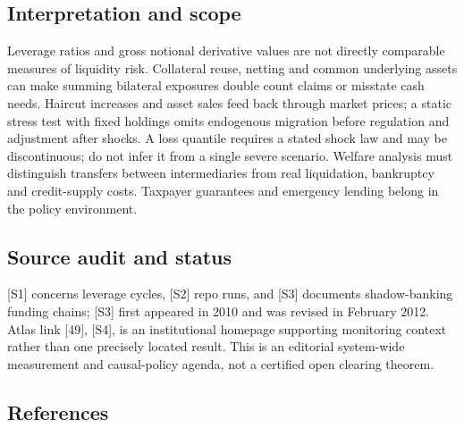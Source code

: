 \documentclass[11pt,a4paper]{article}
\begin{document}
\subsection*{Interpretation and scope}
Leverage ratios and gross notional derivative values are not directly comparable measures of liquidity risk. Collateral reuse, netting and common underlying assets can make summing bilateral exposures double count claims or misstate cash needs. Haircut increases and asset sales feed back through market prices; a static stress test with fixed holdings omits endogenous migration before regulation and adjustment after shocks. A loss quantile requires a stated shock law and may be discontinuous; do not infer it from a single severe scenario. Welfare analysis must distinguish transfers between intermediaries from real liquidation, bankruptcy and credit-supply costs. Taxpayer guarantees and emergency lending belong in the policy environment.

\subsection*{Source audit and status}
[S1] concerns leverage cycles, [S2] repo runs, and [S3] documents shadow-banking funding chains; [S3] first appeared in 2010 and was revised in February 2012. Atlas link [49], [S4], is an institutional homepage supporting monitoring context rather than one precisely located result. This is an editorial system-wide measurement and causal-policy agenda, not a certified open clearing theorem.

\subsection*{References}
\end{document}
